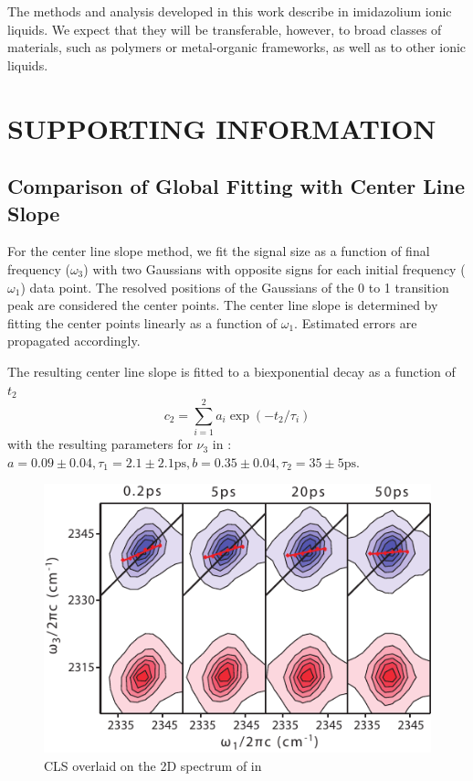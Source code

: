 \documentclass[%
  class = book,%
  crop = false,%
  float = true,%
  multi = true,%
  preview = false,%
]{standalone}
\newcommand{\caps}[1]{\uppercase{#1}}
\begin{document}
{The methods and analysis developed in this work describe  in imidazolium ionic liquids. We expect that they will be transferable, however, to broad classes of materials, such as polymers or metal-organic frameworks, as well as to other ionic liquids.

\section{\texorpdfstring{\caps{Supporting Information}}{Supporting Information}}
\label{paper_01:sec:SI}

\subsection{Comparison of Global Fitting with Center Line Slope}
\label{anionSI_CLS}

For the center line slope method, we fit the signal size as a function of final frequency (\(\omega_3\)) with two Gaussians with opposite signs for each initial frequency (\(\omega_1\)) data point. The resolved positions of the Gaussians of the 0 to 1 transition peak are considered the center points. The center line slope is determined by  fitting the center points linearly as a function of \(\omega_1\). Estimated errors are propagated accordingly.

The resulting center line slope is fitted to a biexponential decay as a function of \(t_2\)
\begin{equation}
c_2 = \sum_{i=1}^2 a_i \exp{\left( -t_2/\tau_i \right)}
\end{equation}
with the resulting parameters for  \(\nu_3\) in \ce{[Im_{4,1}][TFA]}: \(a = 0.09 \pm 0.04, \tau_1 = 2.1 \pm 2.1 \si{\ps}, b = 0.35 \pm 0.04, \tau_2 = 35 \pm 5 \si{\ps}\).

\begin{figure}[h]
  \centering
  \includegraphics[scale=0.8]{CLS_BMIMTFA.pdf}
  \caption[CLS overlaid on 2D-IR spectrum]{CLS overlaid on the 2D spectrum of  in \ce{[Im_{4,1}][TFA]}}
\end{figure}

}
\end{document}
